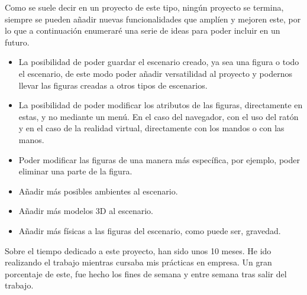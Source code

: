\documentclass[a4paper, 12pt]{book}
\begin{document}
Como se suele decir en un proyecto de este tipo, ningún proyecto se termina, siempre se pueden añadir nuevas funcionalidades que amplíen y mejoren este, por lo que a continuación enumeraré una serie de ideas para poder incluir en un futuro.

\begin{itemize}
    \item La posibilidad de poder guardar el escenario creado, ya sea una figura o todo el escenario, de este modo poder añadir versatilidad al proyecto y podernos llevar las figuras creadas a otros tipos de escenarios.
    \item La posibilidad de poder modificar los atributos de las figuras, directamente en estas, y no mediante un menú. En el caso del navegador, con el uso del ratón y en el caso de la realidad virtual, directamente con los mandos o con las manos.
    \item Poder modificar las figuras de una manera más específica, por ejemplo, poder eliminar una parte de la figura.
    \item Añadir más posibles ambientes al escenario.
    \item Añadir más modelos 3D al escenario.
    \item Añadir más físicas a las figuras del escenario, como puede ser, gravedad.
\end{itemize}

Sobre el tiempo dedicado a este proyecto, han sido unos 10 meses. He ido realizando el trabajo mientras cursaba mis prácticas en empresa. Un gran porcentaje de este, fue hecho los fines de semana y entre semana tras salir del trabajo.

\cleardoublepage


\end{document}
